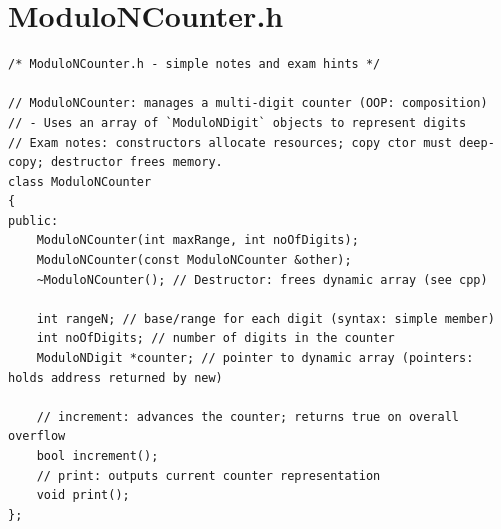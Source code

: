 \documentclass[11pt]{article}
\begin{document}
\section*{ModuloNCounter.h}
\begin{lstlisting}
/* ModuloNCounter.h - simple notes and exam hints */

// ModuloNCounter: manages a multi-digit counter (OOP: composition)
// - Uses an array of `ModuloNDigit` objects to represent digits
// Exam notes: constructors allocate resources; copy ctor must deep-copy; destructor frees memory.
class ModuloNCounter
{
public:
    ModuloNCounter(int maxRange, int noOfDigits);
    ModuloNCounter(const ModuloNCounter &other);
    ~ModuloNCounter(); // Destructor: frees dynamic array (see cpp)

    int rangeN; // base/range for each digit (syntax: simple member)
    int noOfDigits; // number of digits in the counter
    ModuloNDigit *counter; // pointer to dynamic array (pointers: holds address returned by new)

    // increment: advances the counter; returns true on overall overflow
    bool increment();
    // print: outputs current counter representation
    void print();
};
\end{lstlisting}
\end{document}
